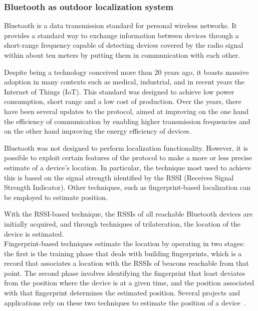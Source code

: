 \subsubsection{Bluetooth as outdoor localization system}
Bluetooth is a data transmission standard for personal wireless networks. It provides a standard way to exchange information between devices through
a short-range frequency capable of detecting devices covered by the radio signal within about ten meters by putting them in communication with each
other.

Despite being a technology conceived more than 20 years ago, it boasts massive adoption in many contexts such as medical, industrial, and in recent
years the Internet of Things (IoT). This standard was designed to achieve low power consumption, short range and a low cost of production. Over the
years, there have been several updates to the protocol, aimed at improving on the one hand the efficiency of communication by enabling higher
transmission frequencies and on the other hand improving the energy efficiency of devices.

Bluetooth was not designed to perform localization functionality. However, it is possible to exploit certain features of the protocol to make a more
or less precise estimate of a device's location. In particular, the technique most used to achieve this is based on the signal strength identified by
the RSSI (Receives Signal Strength Indicator). Other techniques, such as fingerprint-based localization can be employed to estimate position.

With the RSSI-based technique, the RSSIs of all reachable Bluetooth devices are initially acquired, and through techniques of trilateration, the
location of the device is estimated.\\ Fingerprint-based techniques estimate the location by operating in two stages: the first is the training phase
that deals with building fingerprints, which is a record that associates a location with the RSSIs of beacons reachable from that point. The second
phase involves identifying the fingerprint that least deviates from the position where the device is at a given time, and the position associated
with that fingerprint determines the estimated position. Several projects and applications rely on these two techniques to estimate the position of a
device~\cite{mcconville2021vesta, samuel2021smart}.

